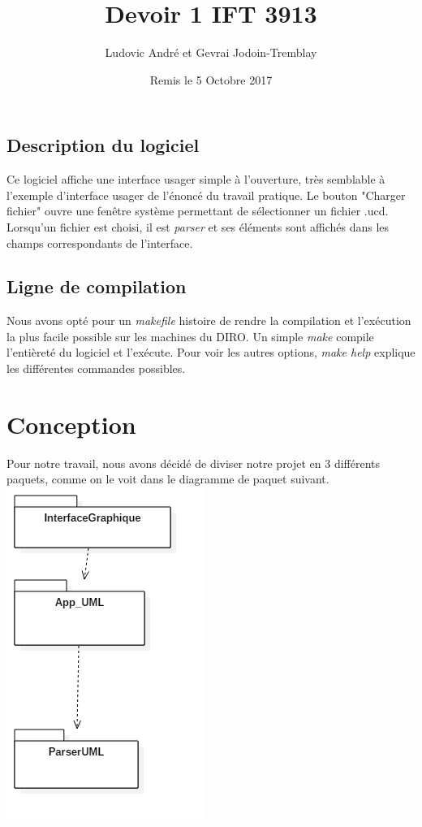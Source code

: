 \documentclass[letter,french]{report}
\begin{document}
	\title{Devoir 1 IFT 3913}
	\author{Ludovic André et Gevrai Jodoin-Tremblay}
	\date{Remis le 5 Octobre 2017}
	\maketitle
	
	
	\subsection*{Description du logiciel}
	Ce logiciel affiche une interface usager simple à l'ouverture, très semblable
	à l'exemple d'interface usager de l'énoncé du travail pratique. Le bouton "Charger
	fichier" ouvre une fenêtre système permettant de sélectionner un fichier .ucd.
	Lorsqu'un fichier est choisi, il est \emph{parser} et ses éléments sont affichés dans
	les champs correspondants de l'interface.
	
	\subsection*{Ligne de compilation}
	Nous avons opté pour un \emph{makefile} histoire de rendre la compilation et l'exécution
	la plus facile possible sur les machines du DIRO. Un simple \emph{make} compile
	l'entièreté du logiciel et l'exécute. Pour voir les autres options, \emph{make help}
	explique les différentes commandes possibles.
	
	\section*{Conception}
	Pour notre travail, nous avons décidé de diviser notre projet en 3 différents
	paquets, comme on le voit dans le diagramme de paquet suivant.
	\newline 
	\includegraphics[scale=.3]{DiagrammePaquet.png}
	
\end{document}
